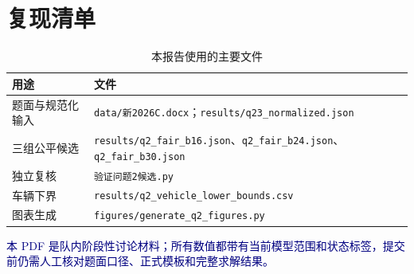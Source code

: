 \documentclass[UTF8,12pt,a4paper,fontset=none]{ctexart}
\begin{document}
\section{复现清单}
\begin{table}[H]
\centering\small
\caption{本报告使用的主要文件}
\begin{tabularx}{\linewidth}{l X}
\toprule
用途 & 文件\\
\midrule
题面与规范化输入 & \texttt{data/新2026C.docx}；\texttt{results/q23\_normalized.json}\\
三组公平候选 & \texttt{results/q2\_fair\_b16.json}、\texttt{q2\_fair\_b24.json}、\texttt{q2\_fair\_b30.json}\\
独立复核 & \texttt{验证问题2候选.py}\\
车辆下界 & \texttt{results/q2\_vehicle\_lower\_bounds.csv}\\
图表生成 & \texttt{figures/generate\_q2\_figures.py}\\
\bottomrule
\end{tabularx}
\end{table}
\vfill
\begin{center}\small\textcolor{navy}{本 PDF 是队内阶段性讨论材料；所有数值都带有当前模型范围和状态标签，提交前仍需人工核对题面口径、正式模板和完整求解结果。}\end{center}
\end{document}
